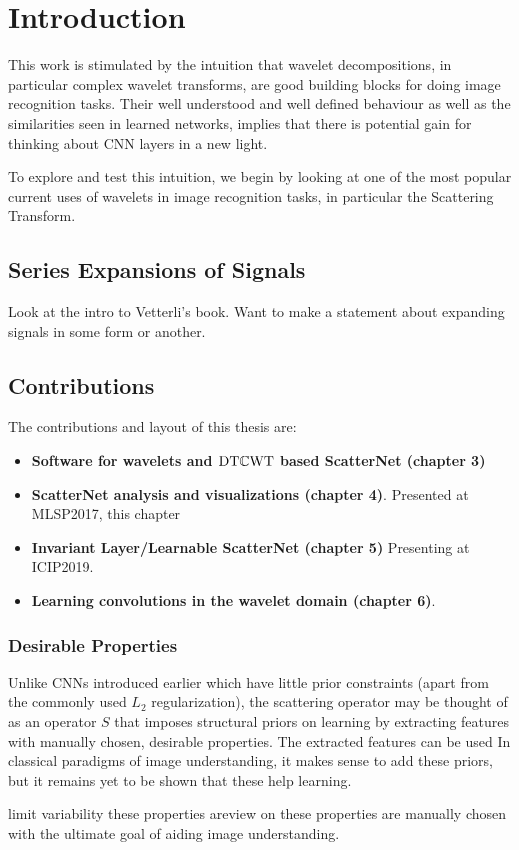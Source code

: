 \chapter{Introduction}\label{ch:intro}

This work is stimulated by the intuition that wavelet decompositions, in particular
complex wavelet transforms, are good building blocks for doing image recognition
tasks. Their well understood and well defined behaviour as well as the
similarities seen in learned networks, implies that there is potential gain for
thinking about CNN layers in a new light. 

To explore and test this intuition, we begin by looking at one of the most popular current uses of
wavelets in image recognition tasks, in particular the Scattering Transform. 

\section{Series Expansions of Signals}
Look at the intro to Vetterli's book. Want to make a statement about expanding
signals in some form or another.

\section{Contributions}
The contributions and layout of this thesis are:

\begin{itemize}
  \item \textbf{Software for wavelets and $\mathrm{DT}\mathbb{C}\mathrm{WT}$ based ScatterNet (chapter 3)}
  \item \textbf{ScatterNet analysis and visualizations (chapter 4)}. Presented
    at MLSP2017, this chapter 
  \item \textbf{Invariant Layer/Learnable ScatterNet (chapter 5)} Presenting at
    ICIP2019.
  \item \textbf{Learning convolutions in the wavelet domain (chapter 6)}.
\end{itemize}

\subsection{Desirable Properties}
Unlike CNNs introduced earlier which have little prior constraints (apart
from the commonly used $L_2$ regularization), the scattering operator may be 
thought of as an operator $S$ that imposes structural priors on learning by
extracting features with manually chosen, desirable properties. The extracted
features can be used In classical
paradigms of image understanding, it makes sense to add these priors, but it
remains yet to be shown that these help learning.

limit variability these properties areview on these
properties are manually chosen with the ultimate goal of aiding image
understanding. 

